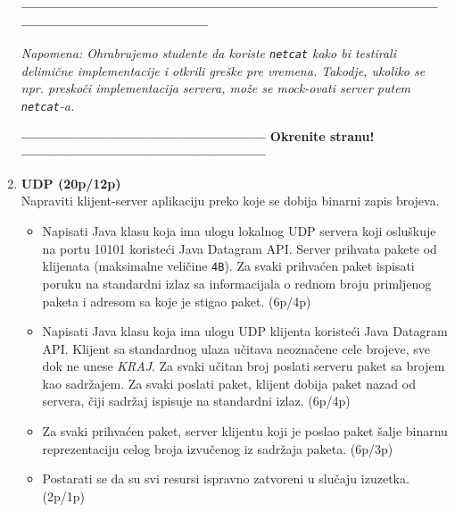\documentclass[]{article}
\begin{document}
\begin{enumerate}
\vspace{15pt}
\begin{center}
  \textbf{------------------------------------------------------------------------------------------------------------------------------}
\end{center}
\textit{Napomena: Ohrabrujemo studente da koriste \texttt{netcat} kako bi testirali delimi\v{c}ne implementacije i otkrili gre\v{s}ke pre vremena. Takodje, ukoliko se npr. presko\v{c}i implementacija servera, mo\v{z}e se mock-ovati server putem \texttt{netcat}-a.} 
\begin{center}
  \textbf{--------------------------------------------------- Okrenite stranu! ---------------------------------------------------}
\end{center}

\newpage

\item \textbf{UDP (20p/12p)}
\\Napraviti klijent-server aplikaciju preko koje se dobija binarni zapis brojeva.
\begin{itemize}
  \item Napisati Java klasu koja ima ulogu lokalnog UDP servera koji oslu\v{s}kuje na portu 10101 koriste\'c{}i Java Datagram API. Server prihvata pakete od klijenata (maksimalne veličine \texttt{4B}). Za svaki prihvaćen paket ispisati poruku na standardni izlaz sa informacijala o rednom broju primljenog paketa i adresom sa koje je stigao paket. \hfill (6p/4p)
  \item Napisati Java klasu koja ima ulogu UDP klijenta koriste\'c{}i Java Datagram API. Klijent sa standardnog ulaza učitava neoznačene cele brojeve, sve dok ne unese \textit{KRAJ}. Za svaki učitan broj poslati serveru paket sa brojem kao sadr\v{z}ajem. Za svaki poslati paket, klijent dobija paket nazad od servera, \v{c}iji sadr\v{z}aj ispisuje na standardni izlaz. \hfill (6p/4p)
  \item Za svaki prihvaćen paket, server klijentu koji je poslao paket šalje binarnu reprezentaciju celog broja izvu\v{c}enog iz sadr\v{z}aja paketa. \hfill (6p/3p)
  \item Postarati se da su svi resursi ispravno zatvoreni u slu\v{c}aju izuzetka. \hfill (2p/1p)
\end{itemize}

\vspace{15pt}


\end{enumerate}
\end{document}
